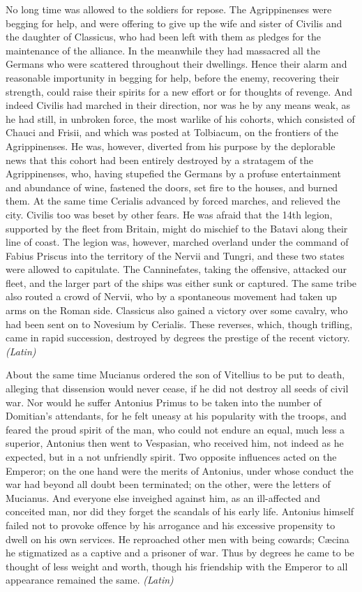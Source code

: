 No long time was allowed to the soldiers for repose. The Agrippinenses were begging for help, and were offering to give up the wife and sister of Civilis and the daughter of Classicus, who had been left with them as pledges for the maintenance of the alliance. In the meanwhile they had massacred all the Germans who were scattered throughout their dwellings. Hence their alarm and reasonable importunity in begging for help, before the enemy, recovering their strength, could raise their spirits for a new effort or for thoughts of revenge. And indeed Civilis had marched in their direction, nor was he by any means weak, as he had still, in unbroken force, the most warlike of his cohorts, which consisted of Chauci and Frisii, and which was posted at Tolbiacum, on the frontiers of the Agrippinenses. He was, however, diverted from his purpose by the deplorable news that this cohort had been entirely destroyed by a stratagem of the Agrippinenses, who, having stupefied the Germans by a profuse entertainment and abundance of wine, fastened the doors, set fire to the houses, and burned them. At the same time Cerialis advanced by forced marches, and relieved the city. Civilis too was beset by other fears. He was afraid that the 14th legion, supported by the fleet from Britain, might do mischief to the Batavi along their line of coast. The legion was, however, marched overland under the command of Fabius Priscus into the territory of the Nervii and Tungri, and these two states were allowed to capitulate. The Canninefates, taking the offensive, attacked our fleet, and the larger part of the ships was either sunk or captured. The same tribe also routed a crowd of Nervii, who by a spontaneous movement had taken up arms on the Roman side. Classicus also gained a victory over some cavalry, who had been sent on to Novesium by Cerialis. These reverses, which, though trifling, came in rapid succession, destroyed by degrees the prestige of the recent victory. \emph{(Latin)}


About the same time Mucianus ordered the son of Vitellius to be put to death, alleging that dissension would never cease, if he did not destroy all seeds of civil war. Nor would he suffer Antonius Primus to be taken into the number of Domitian's attendants, for he felt uneasy at his popularity with the troops, and feared the proud spirit of the man, who could not endure an equal, much less a superior, Antonius then went to Vespasian, who received him, not indeed as he expected, but in a not unfriendly spirit. Two opposite influences acted on the Emperor; on the one hand were the merits of Antonius, under whose conduct the war had beyond all doubt been terminated; on the other, were the letters of Mucianus. And everyone else inveighed against him, as an ill-affected and conceited man, nor did they forget the scandals of his early life. Antonius himself failed not to provoke offence by his arrogance and his excessive propensity to dwell on his own services. He reproached other men with being cowards; Cæcina he stigmatized as a captive and a prisoner of war. Thus by degrees he came to be thought of less weight and worth, though his friendship with the Emperor to all appearance remained the same. \emph{(Latin)}

